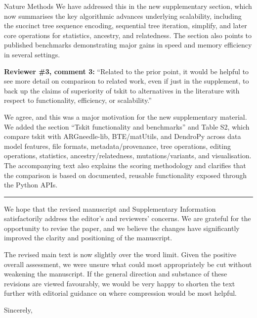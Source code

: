 \documentclass{letter}
\begin{document}
\begin{letter}{Nature Methods}
We have addressed this in the new supplementary section, which now
summarises the key algorithmic advances underlying
scalability, including the succinct tree sequence encoding, sequential tree
iteration, simplify, and later core operations for statistics, ancestry, and
relatedness. The section also points to published benchmarks demonstrating
major gains in speed and memory efficiency in several settings.

\noindent \textbf{Reviewer \#3, comment 3:} ``Related to the prior point, it
would be helpful to see more detail on comparison to related work, even if just
in the supplement, to back up the claims of superiority of tskit to
alternatives in the literature with respect to functionality, efficiency, or
scalability.''

We agree, and this was a major motivation for the new supplementary material.
We added the section ``Tskit functionality and benchmarks'' and Table S2, which
compare tskit with ARGneedle-lib, BTE/matUtils, and DendroPy across data model
features, file formats, metadata/provenance, tree operations, editing
operations, statistics, ancestry/relatedness, mutations/variants, and
visualisation. The accompanying text also explains the scoring methodology and
clarifies that the comparison is based on documented, reusable functionality
exposed through the Python APIs.

\medskip
\hrule
\medskip

We hope that the revised manuscript and Supplementary Information
satisfactorily address the editor's and reviewers' concerns. We are grateful
for the opportunity to revise the paper, and we believe the changes have
significantly improved the clarity and positioning of the manuscript.

The revised main text is now slightly over the word limit.
Given the positive overall assessment,
we were unsure what could most appropriately be cut
without weakening the manuscript. If the general direction and substance of these
revisions are viewed favourably, we would be very happy to shorten the text
further with editorial guidance on where compression would be most helpful.


\closing{Sincerely,}

\end{letter}
\end{document}
